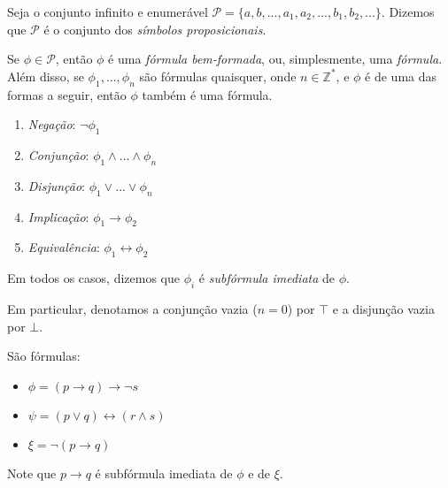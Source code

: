 \begin{definition}
    Seja o conjunto infinito e enumerável $\mathcal{P} = \{a,b,...,a_1,a_2,...,b_1,b_2,...\}$. Dizemos que $\mathcal{P}$ é o conjunto dos \emph{símbolos proposicionais}.
\end{definition}

\begin{definition}
    Se $\phi \in \mathcal{P}$, então $\phi$ é uma \emph{fórmula bem-formada}, ou, simplesmente, uma \emph{fórmula}. Além disso, se $\phi_1,...,\phi_n$ são fórmulas quaisquer, onde $n \in \mathbb{Z}^*$, e $\phi$ é de uma das formas a seguir, então $\phi$ também é uma fórmula.
    \begin{enumerate}
        \item \emph{Negação}: $\neg \phi_1$
        \item \emph{Conjunção}: $\phi_1 \wedge ... \wedge \phi_n$
        \item \emph{Disjunção}: $\phi_1 \vee ... \vee \phi_n$
        \item \emph{Implicação}: $\phi_1 \rightarrow \phi_2$
        \item \emph{Equivalência}: $\phi_1 \leftrightarrow \phi_2$
    \end{enumerate}
    Em todos os casos, dizemos que $\phi_i$ é \emph{subfórmula imediata} de $\phi$.
    
    Em particular, denotamos a conjunção vazia ($n=0$) por $\top$ e a disjunção vazia por $\bot$.
\end{definition}

\begin{example}
	São fórmulas:
	\begin{itemize}
		\item $\phi = (p \rightarrow q) \rightarrow \neg s$
		\item $\psi = (p \vee q) \leftrightarrow (r \wedge s)$
		\item $\xi  = \neg(p \rightarrow q)$
	\end{itemize}
	Note que $p \rightarrow q$ é subfórmula imediata de $\phi$ e de $\xi$.
\end{example}

